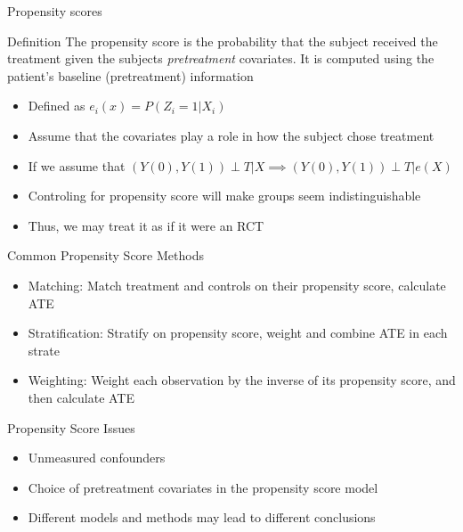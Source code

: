 \begin{frame}{Propensity scores}
\begin{block}{Definition}
The propensity score is the probability that the subject received the treatment given the subjects \textit{pretreatment}
covariates. It is computed using the patient's baseline (pretreatment) information \cite{Rosenbaum1983}
\end{block}
 \begin{itemize}
  \item Defined as  $e_i(x)=P(Z_i =1 |X_i)$
  \item Assume that the covariates play a role in how the subject chose treatment
  \item If we assume that $(Y(0),Y(1))\perp T|X \implies (Y(0),Y(1))\perp T|e(X)$
  \item Controling for propensity score will make groups seem indistinguishable
  \item Thus, we may treat it as if it were an RCT
 \end{itemize}

\end{frame}

\begin{frame}{Common Propensity Score Methods}
\begin{itemize}
 \item Matching: Match treatment and controls on their propensity score, calculate ATE
 \item Stratification: Stratify on propensity score, weight and combine ATE in each strate
 \item Weighting: Weight each observation by the inverse of its propensity score, and then calculate ATE
\end{itemize}
\end{frame}

\begin{frame}{Propensity Score Issues}
 \begin{itemize}
  \item Unmeasured confounders
  \item Choice of pretreatment covariates in the propensity score model
  \item Different models and methods may lead to different conclusions
 \end{itemize}

\end{frame}
